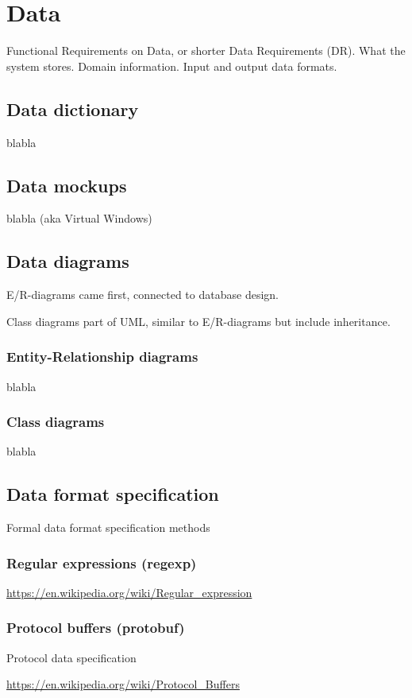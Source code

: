 
\chapter{Data}%

Functional Requirements on Data, or shorter Data Requirements (DR). What the system stores. Domain information. Input and output data formats.

\section{Data dictionary}
blabla

\section{Data mockups}
blabla  (aka Virtual Windows)


\section{Data diagrams}

E/R-diagrams came first, connected to database design.

Class diagrams part of UML, similar to E/R-diagrams but include inheritance.

\subsection{Entity-Relationship diagrams}
blabla

\subsection{Class diagrams}
blabla



\section{Data format specification}

Formal data format specification methods

\subsection{Regular expressions (regexp)}


\url{https://en.wikipedia.org/wiki/Regular_expression}


\subsection{Protocol buffers (protobuf)}

Protocol data specification

\url{https://en.wikipedia.org/wiki/Protocol_Buffers}
